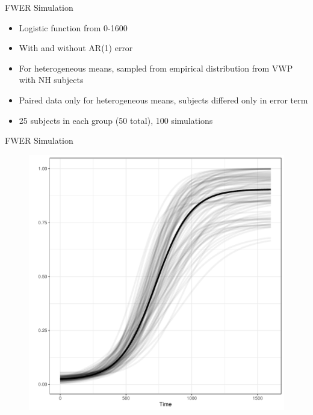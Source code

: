 \documentclass{beamer}
\begin{document}
\begin{frame}{FWER Simulation}
\begin{itemize}
\item Logistic function from 0-1600
\item With and without AR(1) error
\item For heterogeneous means, sampled from empirical distribution from VWP with NH subjects
\item Paired data only for heterogeneous means, subjects differed only in error term
\item 25 subjects in each group (50 total), 100 simulations
\end{itemize}
\end{frame}

\begin{frame}{FWER Simulation}
\begin{figure}
\centering
\includegraphics[scale = 0.4]{logistic_distribution.pdf}
\end{figure}
\end{frame}
\end{document}
